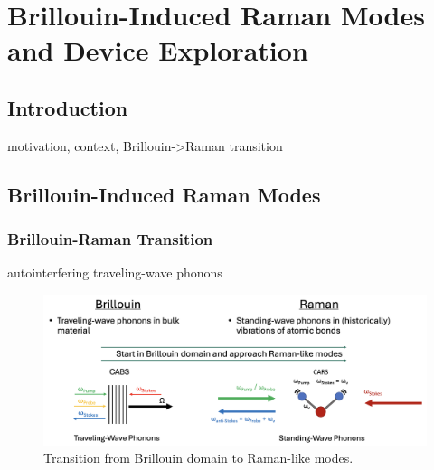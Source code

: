 \setcounter{rownumber}{0}
\singlespacing
\chapter{Brillouin-Induced Raman Modes and Device Exploration}
\label{ch:Raman}
\acresetall

\doublespacing


\section{Introduction}
\label{sec:Raman:Introduction}

motivation, context, Brillouin->Raman transition


\section{Brillouin-Induced Raman Modes}
\label{sec:Raman:Brillouin-Induced}

\subsection{Brillouin-Raman Transition}
\label{subsec:Raman:Brillouin-RamanTransition}

autointerfering traveling-wave phonons

\begin{figure}[t]
  \centering
  \includegraphics[width=\textwidth]{figs/4-Raman/ExploreBrillouinRamanTransition.png}
  \caption{Transition from Brillouin domain to Raman-like modes.}
  \label{fig:Raman:BrillouinRamanTransition}
\end{figure}

